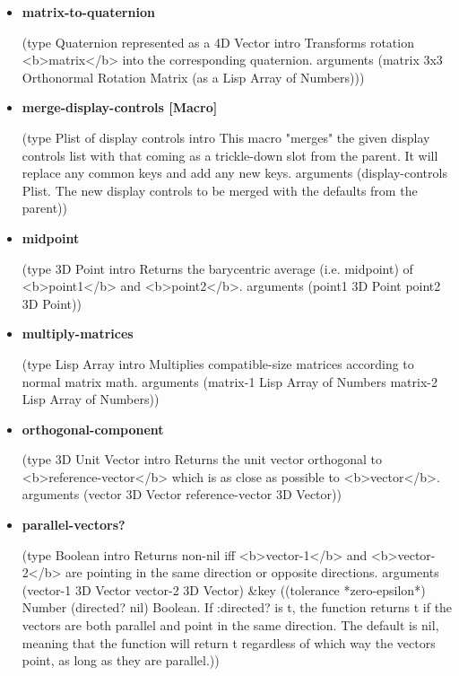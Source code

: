 \documentclass [11pt]{book}
\begin{document}
\begin{itemize}
\item {}
\label{prim:matrix-to-quaternion}
\textbf{matrix-to-quaternion}

(type Quaternion represented as a 4D Vector intro
  Transforms rotation <b>matrix</b> into the corresponding quaternion.
 arguments
 (matrix 3x3 Orthonormal Rotation Matrix (as a Lisp Array of Numbers)))



\item {}
\label{prim:merge-display-controls}
\textbf{merge-display-controls [Macro]}

(type Plist of display controls intro
  This macro "merges" the given display controls list with
that coming as a trickle-down slot from the parent. It will replace any common keys and
add any new keys.
 arguments
 (display-controls
  Plist. The new display controls to be merged with the defaults from the parent))



\item {}
\label{prim:midpoint}
\textbf{midpoint}

(type 3D Point intro  Returns the barycentric average (i.e. midpoint)
of <b>point1</b> and <b>point2</b>.
 arguments (point1 3D Point point2 3D Point))



\item {}
\label{prim:multiply-matrices}
\textbf{multiply-matrices}

(type Lisp Array intro
  Multiplies compatible-size matrices according to normal matrix math.
 arguments
 (matrix-1 Lisp Array of Numbers matrix-2 Lisp Array of Numbers))



\item {}
\label{prim:orthogonal-component}
\textbf{orthogonal-component}

(type 3D Unit Vector intro
  Returns the unit vector orthogonal to <b>reference-vector</b> which
is as close as possible to <b>vector</b>.
 arguments (vector 3D Vector reference-vector 3D Vector))



\item {}
\label{prim:parallel-vectors?}
\textbf{parallel-vectors?}

(type Boolean intro
  Returns non-nil iff <b>vector-1</b> and <b>vector-2</b> are pointing in the
same direction or opposite directions.
 arguments (vector-1 3D Vector vector-2 3D Vector) \&key
 ((tolerance *zero-epsilon*) Number (directed? nil)
  Boolean.  If :directed? is t, the function returns t if the vectors are both parallel and point in the same direction.  The default is nil, meaning that the function will return t regardless of which way the vectors point, as long as they are parallel.))




\end{itemize}
\end{document}
